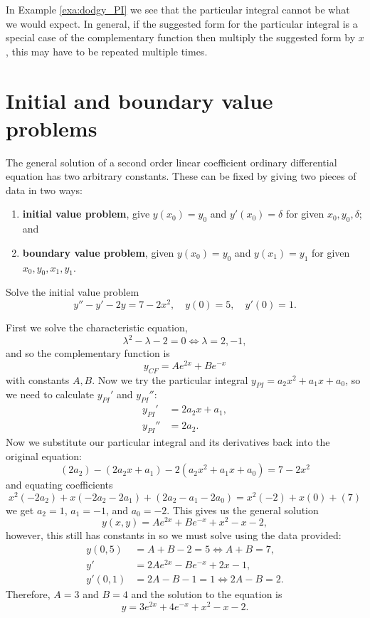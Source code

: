 \begin{remark}
    In Example \ref{exa:dodgy_PI} we see that the particular integral cannot be what we would expect. In general, if the suggested form for the particular integral is a special case of the complementary function then multiply the suggested form by $x$, this may have to be repeated multiple times.
\end{remark}

\section{Initial and boundary value problems}

\begin{definition}
    The general solution of a second order linear coefficient ordinary differential equation has two arbitrary constants. These can be fixed by giving two pieces of data in two ways:
    \begin{enumerate}
        \item \textbf{initial value problem}, give $y(x_0)=y_0$ and $y'(x_0)=\delta$ for given $x_0,y_0,\delta$; and
        \item \textbf{boundary value problem}, given $y(x_0)=y_0$ and $y(x_1)=y_1$ for given $x_0,y_0,x_1,y_1$.
    \end{enumerate}
\end{definition}

\begin{example}
    Solve the initial value problem \[y''-y'-2y=7-2x^2,\quad y(0)=5,\quad y'(0)=1.\]
    
    First we solve the characteristic equation, \[\lambda^2-\lambda-2=0\iff\lambda=2,-1,\] and so the complementary function is \[y_{CF}=Ae^{2x}+Be^{-x}\] with constants $A,B$. Now we try the particular integral $y_{PI}=a_2x^2+a_1x+a_0$, so we need to calculate $y_{PI}'$ and $y_{PI}''$:
    \begin{align*}
        y_{PI}'&=2a_2x+a_1,\\
        y_{PI}''&=2a_2.
    \end{align*}
    Now we substitute our particular integral and its derivatives back into the original equation: \[(2a_2)-(2a_2x+a_1)-2(a_2x^2+a_1x+a_0)=7-2x^2\] and equating coefficients \[x^2(-2a_2)+x(-2a_2-2a_1)+(2a_2-a_1-2a_0)=x^2(-2)+x(0)+(7)\] we get $a_2=1$, $a_1=-1$, and $a_0=-2$. This gives us the general solution \[y(x,y)=Ae^{2x}+Be^{-x}+x^2-x-2,\] however, this still has constants in so we must solve using the data provided:
    \begin{align*}
        y(0,5)&=A+B-2=5\iff A+B=7,\\
        y'&=2Ae^{2x}-Be^{-x}+2x-1,\\
        y'(0,1)&=2A-B-1=1\iff 2A-B=2.
    \end{align*}
    Therefore, $A=3$ and $B=4$ and the solution to the equation is \[y=3e^{2x}+4e^{-x}+x^2-x-2.\]
\end{example}

